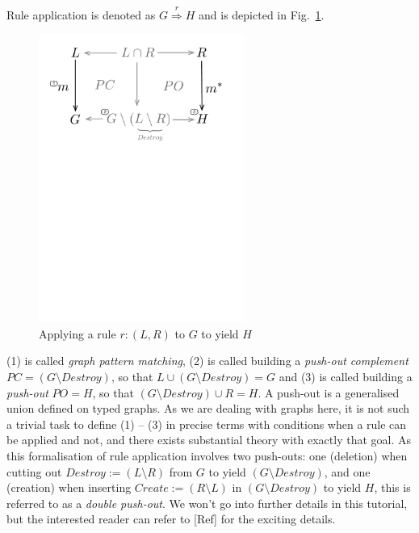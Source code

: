 Rule application is denoted as $G \stackrel{r}{\Rightarrow} H$ and is depicted
in Fig.~\ref{fig:rule_application}. 

\begin{figure}[htp]
\begin{center}
  \includegraphics[width=0.6\textwidth]{pics/rule_application}
  \caption[]{Applying a rule $r: (L,R)$ to $G$ to yield $H$} 
  \label{fig:rule_application}
\end{center}
\end{figure}

(1) is called \emph{graph pattern matching}, (2) is called building a
\emph{push-out complement} $PC = (G\setminus Destroy)$, so that $L \cup
(G\setminus Destroy) = G$ and (3) is called building a \emph{push-out} $PO = H$,
so that $(G\setminus Destroy) \cup R = H$. A push-out is a generalised union
defined on typed graphs.  As we are dealing with graphs here, it is not such a
trivial task to define (1) -- (3) in precise terms with conditions when a rule
can be applied and not, and there exists substantial theory with exactly that
goal. As this formalisation of rule application involves two push-outs: one
(deletion) when cutting out $Destroy := (L\setminus R)$ from $G$ to yield
$(G\setminus Destroy)$, and one (creation) when inserting $Create := (R\setminus
L)$ in $(G\setminus Destroy)$ to yield $H$, this is referred to as a
\emph{double push-out}.  
We won't go into further details in this tutorial, but the interested reader can
refer to [Ref] for the exciting details.  

